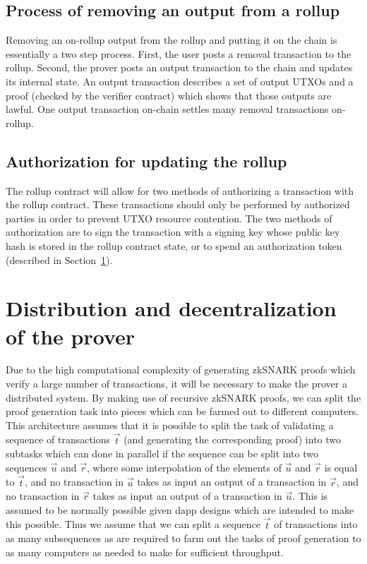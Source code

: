 \documentclass[12pt]{article}
\begin{document}
\subsection{Process of removing an output from a rollup}

Removing an on-rollup output from the rollup and putting it on the chain is essentially a two step process. First, the user posts a removal transaction to the rollup. Second, the prover posts an output transaction to the chain and updates its internal state. An output transaction describes a set of output UTXOs and a proof (checked by the verifier contract) which shows that those outputs are lawful. One output transaction on-chain settles many removal transactions on-rollup.

\subsection{Authorization for updating the rollup}

The rollup contract will allow for two methods of authorizing a transaction with the rollup contract. These transactions should only be performed by authorized parties in order to prevent UTXO resource contention. The two methods of authorization are to sign the transaction with a signing key whose public key hash is stored in the rollup contract state, or to spend an authorization token (described in Section~\ref{sec:distribution-decentralization}).


\section{Distribution and decentralization of the prover}
\label{sec:distribution-decentralization}

Due to the high computational complexity of generating zkSNARK proofs which verify a large number of transactions, it will be necessary to make the prover a distributed system. By making use of recursive zkSNARK proofs, we can split the proof generation task into pieces which can be farmed out to different computers. This architecture assumes that it is possible to split the task of validating a sequence of transactions $\vec{t}$ (and generating the corresponding proof) into two subtasks which can done in parallel if the sequence can be split into two sequences $\vec{u}$ and $\vec{r}$, where some interpolation of the elements of $\vec{u}$ and $\vec{r}$ is equal to $\vec{t}$, and no transaction in $\vec{u}$ takes as input an output of a transaction in $\vec{r}$, and no transaction in $\vec{r}$ takes as input an output of a transaction in $\vec{u}$. This is assumed to be normally possible given dapp designs which are intended to make this possible. Thus we assume that we can split a sequence $\vec{t}$ of transactions into as many subsequences as are required to farm out the tasks of proof generation to as many computers as needed to make for sufficient throughput.
\end{document}
